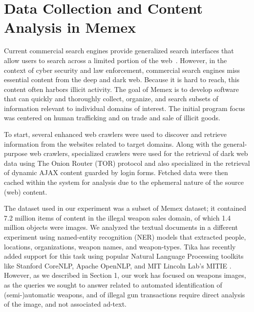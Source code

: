 \section{Data Collection and Content Analysis in Memex}
\label{sec:memex-data}
Current commercial search engines provide generalized search interfaces that allow users to search across a limited portion of the web~\cite{fbo-memex}. However, in the context of cyber security and law enforcement, commercial search engines miss essential content from the deep and dark web. Because it is hard to reach, this content often harbors illicit activity. The goal of Memex is to develop software that can quickly and thoroughly collect, organize, and search subsets of information relevant to individual domains of interest. The initial program focus was centered on human trafficking and on trade and sale of illicit goods.

To start, several enhanced web crawlers were used to discover and retrieve information from the websites related to target domains. Along with the general-purpose web crawlers, specialized crawlers were used for the retrieval of dark web data using The Onion Router (TOR) protocol \cite{mentor2016onion} and also specialized in the retrieval of dynamic AJAX content guarded by login forms. Fetched data were then cached within the system for analysis due to the ephemeral nature of the source (web) content.

The dataset used in our experiment was a subset of Memex dataset; it contained 7.2 million items of content in the illegal weapon sales domain, of which 1.4 million objects were images. We analyzed the textual documents in a different experiment using named-entity recognition (NER) models that extracted people, locations, organizations, weapon names, and weapon-types. Tika has recently added support for this task using popular Natural Language Processing toolkits like Stanford CoreNLP\cite{Finkel:2005:INI:1219840.1219885}, Apache OpenNLP\cite{ApacheOpenNLP}, and MIT Lincoln Lab's MITIE \cite{MITIE-github}. However, as we described in Section 1, our work has focused on weapons images, as the queries we sought to answer related to automated identification of (semi-)automatic weapons, and of illegal gun transactions require direct analysis of the image, and not associated ad-text.

